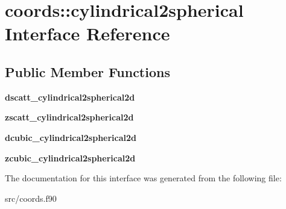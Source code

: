 \hypertarget{interfacecoords_1_1cylindrical2spherical}{}\section{coords\+:\+:cylindrical2spherical Interface Reference}
\label{interfacecoords_1_1cylindrical2spherical}
\subsection*{Public Member Functions}
\begin{DoxyCompactItemize}
\item 
\mbox{\label{interfacecoords_1_1cylindrical2spherical_a9c0ced65e0ff22f04d57e9b399340a2b}} 
{\bfseries dscatt\+\_\+cylindrical2spherical2d}
\item 
\mbox{\label{interfacecoords_1_1cylindrical2spherical_af3e47a93d1333fef6148f9b18739c789}} 
{\bfseries zscatt\+\_\+cylindrical2spherical2d}
\item 
\mbox{\label{interfacecoords_1_1cylindrical2spherical_a4b1e65253c91720c9cb09efcfd0d8722}} 
{\bfseries dcubic\+\_\+cylindrical2spherical2d}
\item 
\mbox{\label{interfacecoords_1_1cylindrical2spherical_a29deb5ee46e1c522e05ee77ae5c35fae}} 
{\bfseries zcubic\+\_\+cylindrical2spherical2d}
\end{DoxyCompactItemize}


The documentation for this interface was generated from the following file\+:\begin{DoxyCompactItemize}
\item 
src/coords.\+f90\end{DoxyCompactItemize}
